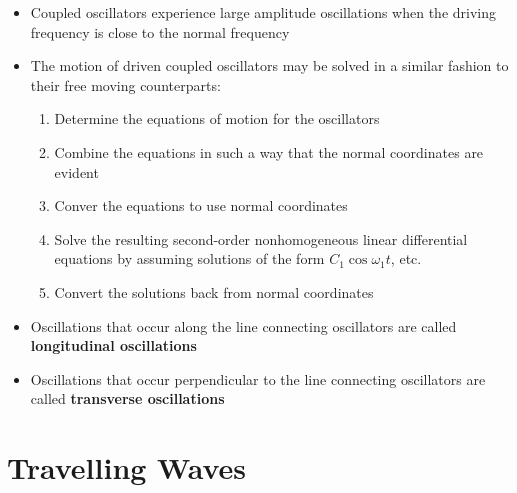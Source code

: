 \documentclass{article}
\begin{document}
\begin{itemize}
  \item Coupled oscillators experience large amplitude oscillations when the driving frequency is close to the normal frequency

  \item The motion of driven coupled oscillators may be solved in a similar fashion to their free moving counterparts:

        \begin{enumerate}
          \item Determine the equations of motion for the oscillators

          \item Combine the equations in such a way that the normal coordinates are evident

          \item Conver the equations to use normal coordinates

          \item Solve the resulting second-order nonhomogeneous linear differential equations by assuming solutions of the form $C_1 \cos \omega_1 t$, etc.

          \item Convert the solutions back from normal coordinates
        \end{enumerate}

  \item Oscillations that occur along the line connecting oscillators are called \textbf{longitudinal oscillations}

  \item Oscillations that occur perpendicular to the line connecting oscillators are called \textbf{transverse oscillations}
\end{itemize}

\section{Travelling Waves}
\end{document}
